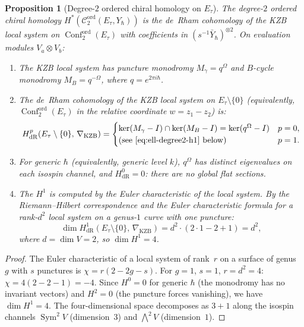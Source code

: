\documentclass[11pt,reqno]{amsart}
\newtheorem{proposition}[theorem]{Proposition}
\theoremstyle{definition}
\theoremstyle{remark}
\newcommand{\cC}{\mathcal{C}}
\DeclareMathOperator{\Conf}{Conf}
\numberwithin{equation}{section}
\begin{document}
\begin{proposition}[Degree-$2$ ordered chiral homology on
$E_\tau$]
\label{prop:ell-degree2}
The degree-$2$ ordered chiral homology
$H^*(\cC_2^{\mathrm{ord}}(E_\tau, Y_\hbar))$ is the de~Rham
cohomology of the KZB local system on
$\Conf_2^{\mathrm{ord}}(E_\tau)$ with coefficients in
$(s^{-1}\bar{Y}_\hbar)^{\otimes 2}$.
On evaluation modules $V_a \otimes V_b$:
\begin{enumerate}[label=\textup{(\roman*)}]
\item The KZB local system has puncture monodromy
  $M_\gamma = q^{\Omega}$ and $B$-cycle monodromy
  $M_B = q^{-\Omega}$, where $q = e^{2\pi i \hbar}$.
\item The de~Rham cohomology of the KZB local system on
  $E_\tau \setminus \{0\}$ \textup{(}equivalently,
  $\Conf_2^{\mathrm{ord}}(E_\tau)$ in the relative
  coordinate $w = z_1 - z_2$\textup{)} is:
  \begin{equation}\label{eq:ell-degree2-dr}
    H^p_{\mathrm{dR}}(E_\tau \setminus \{0\},\,
    \nabla_{\mathrm{KZB}})
    = \begin{cases}
      \ker(M_\gamma - I) \cap \ker(M_B - I)
      = \ker(q^{\Omega} - I)
      & p = 0, \\
      \text{\textup{(}see~\eqref{eq:ell-degree2-h1}
      below\textup{)}}
      & p = 1.
    \end{cases}
  \end{equation}
\item For generic $\hbar$ \textup{(}equivalently, generic
  level $k$\textup{)}, $q^{\Omega}$ has distinct
  eigenvalues on each isospin channel, and
  $H^0_{\mathrm{dR}} = 0$: there are no global flat
  sections.
\item The $H^1$ is computed by the Euler characteristic
  of the local system. By the Riemann--Hilbert
  correspondence and the Euler characteristic formula for
  a rank-$d^2$ local system on a genus-$1$ curve with one
  puncture:
  \begin{equation}\label{eq:ell-degree2-h1}
    \dim H^1_{\mathrm{dR}}(E_\tau \setminus \{0\},\,
    \nabla_{\mathrm{KZB}})
    = d^2 \cdot (2 \cdot 1 - 2 + 1)
    = d^2,
  \end{equation}
  where $d = \dim V = 2$, so $\dim H^1 = 4$.
\end{enumerate}
\end{proposition}

\begin{proof}
The Euler characteristic of a local system of rank~$r$ on a
surface of genus~$g$ with $s$ punctures is
$\chi = r(2 - 2g - s)$. For $g = 1$, $s = 1$, $r = d^2 = 4$:
$\chi = 4(2 - 2 - 1) = -4$. Since $H^0 = 0$ for generic
$\hbar$ (the monodromy has no invariant vectors) and
$H^2 = 0$ (the puncture forces vanishing), we have
$\dim H^1 = 4$. The four-dimensional space decomposes as
$3 + 1$ along the isospin channels $\operatorname{Sym}^2 V$
(dimension~$3$) and $\bigwedge^2 V$ (dimension~$1$).
\end{proof}
\end{document}
